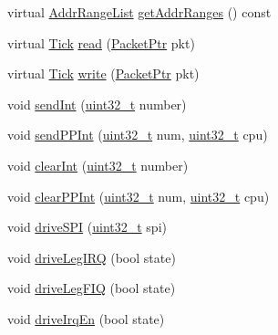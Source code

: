 \begin{Indent}{\bf }\par
{\em \label{_amgrpd41d8cd98f00b204e9800998ecf8427e}
 }\begin{DoxyCompactItemize}
\item 
virtual \hyperlink{classstd_1_1list}{AddrRangeList} \hyperlink{classPl390_a36cf113d5e5e091ebddb32306c098fae}{getAddrRanges} () const 
\item 
virtual \hyperlink{base_2types_8hh_a5c8ed81b7d238c9083e1037ba6d61643}{Tick} \hyperlink{classPl390_a613ec7d5e1ec64f8d21fec78ae8e568e}{read} (\hyperlink{classPacket}{PacketPtr} pkt)
\item 
virtual \hyperlink{base_2types_8hh_a5c8ed81b7d238c9083e1037ba6d61643}{Tick} \hyperlink{classPl390_a4cefab464e72b5dd42c003a0a4341802}{write} (\hyperlink{classPacket}{PacketPtr} pkt)
\item 
void \hyperlink{classPl390_afbcaff37cd3cabac35c8fa0154de991f}{sendInt} (\hyperlink{Type_8hh_a435d1572bf3f880d55459d9805097f62}{uint32\_\-t} number)
\item 
void \hyperlink{classPl390_a4780a1058316daff7b2c8f980c681101}{sendPPInt} (\hyperlink{Type_8hh_a435d1572bf3f880d55459d9805097f62}{uint32\_\-t} num, \hyperlink{Type_8hh_a435d1572bf3f880d55459d9805097f62}{uint32\_\-t} cpu)
\item 
void \hyperlink{classPl390_a43d165dfc36b3fd1a965f2dc34eb1eda}{clearInt} (\hyperlink{Type_8hh_a435d1572bf3f880d55459d9805097f62}{uint32\_\-t} number)
\item 
void \hyperlink{classPl390_a48c1db2ce97470c7d34ee199564c2929}{clearPPInt} (\hyperlink{Type_8hh_a435d1572bf3f880d55459d9805097f62}{uint32\_\-t} num, \hyperlink{Type_8hh_a435d1572bf3f880d55459d9805097f62}{uint32\_\-t} cpu)
\item 
void \hyperlink{classPl390_a20535305eb1231d731f6f34a69e96d78}{driveSPI} (\hyperlink{Type_8hh_a435d1572bf3f880d55459d9805097f62}{uint32\_\-t} spi)
\item 
void \hyperlink{classPl390_af2be17097e8a42c381ba82762df24562}{driveLegIRQ} (bool state)
\item 
void \hyperlink{classPl390_a113a9013ccbd1b5de2b9de1955ed009d}{driveLegFIQ} (bool state)
\item 
void \hyperlink{classPl390_a6bad935267245423d679e5138064ccba}{driveIrqEn} (bool state)
\end{DoxyCompactItemize}
\end{Indent}
